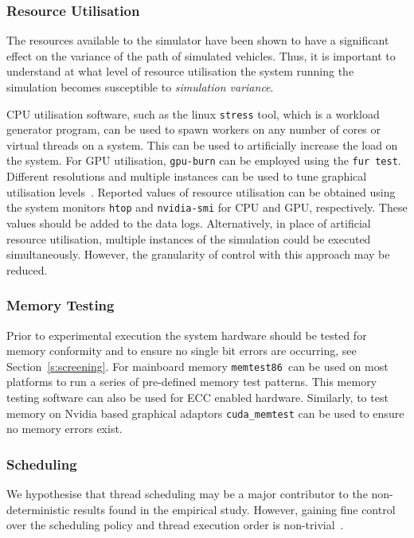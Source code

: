 \subsubsection{Resource Utilisation}
The resources available to the simulator have been shown to have a significant effect on the variance of the path of simulated vehicles. Thus, it is important to understand at what level of resource utilisation the system running the simulation becomes susceptible to \textit{simulation variance}.

CPU utilisation software, such as the linux \texttt{stress} tool, which is a workload generator program, can be used to spawn workers on any number of cores or virtual threads on a system. This can be used to artificially increase the load on the system. For GPU utilisation, \texttt{gpu-burn} can be employed using the \texttt{fur test}. Different resolutions and multiple instances can be used to tune graphical utilisation levels~\cite{GPU_stress}. Reported values of resource utilisation can be obtained using the system monitors \texttt{htop} and \texttt{nvidia-smi} for CPU and GPU, respectively. These values should be added to the data logs. Alternatively, in place of artificial resource utilisation, multiple instances of the simulation could be executed simultaneously. However, the granularity of control with this approach may be reduced.

\subsubsection{Memory Testing}
Prior to experimental execution the system hardware should be tested for memory conformity and to ensure no single bit errors are occurring, see Section~\ref{s:screening}. For mainboard memory \texttt{memtest86}\ can be used on most platforms to run a series of pre-defined memory test patterns. This memory testing software can also be used for ECC enabled hardware. Similarly, to test memory on Nvidia based graphical adaptors \texttt{cuda\_memtest} can be used to ensure no memory errors exist.

\subsubsection{Scheduling}
We hypothesise that thread scheduling may be a major contributor to the non-deterministic results found in the empirical study. However, gaining fine control over the scheduling policy and thread execution order is non-trivial~\cite{acm-q-rr-interview}. \DIFdelbegin %

